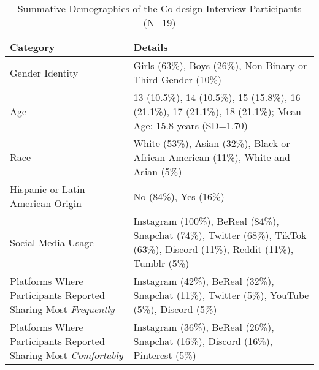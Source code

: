 \begin{table*}[h]
\centering
 \small
\renewcommand{\arraystretch}{1.2} 

\caption{Summative Demographics of the Co-design Interview Participants (N=19)}
\label{ref:demographics-summary}
\begin{tabular}{p{5.5cm} p{9cm}}
\toprule
\textbf{Category} & \textbf{Details} \\
\midrule

{Gender Identity} & Girls (63\%), Boys (26\%), Non-Binary or Third Gender (10\%) \\

{Age} & 13 (10.5\%), 14 (10.5\%), 15 (15.8\%), 16 (21.1\%), 17 (21.1\%), 18 (21.1\%); Mean Age: 15.8 years (SD=1.70) \\

{Race} & White (53\%), Asian (32\%), Black or African American (11\%), White and Asian (5\%) \\

{Hispanic or Latin-American Origin} & No (84\%), Yes (16\%) \\

{Social Media Usage} & Instagram (100\%), BeReal (84\%), Snapchat (74\%), Twitter (68\%), TikTok (63\%), Discord (11\%), Reddit (11\%), Tumblr (5\%) \\

{Platforms Where Participants Reported Sharing Most \textit{Frequently}} & Instagram (42\%), BeReal (32\%), Snapchat (11\%), Twitter (5\%), YouTube (5\%), Discord (5\%) \\

{Platforms Where Participants Reported Sharing Most \textit{Comfortably}} & Instagram (36\%), BeReal (26\%), Snapchat (16\%), Discord (16\%), Pinterest (5\%)\\

\bottomrule
\end{tabular}
\end{table*}
